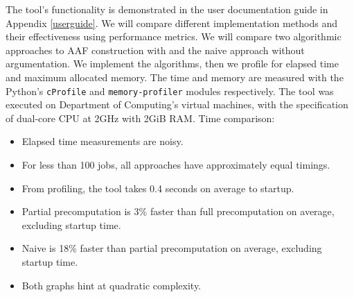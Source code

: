 The tool's functionality is demonstrated in the user documentation guide in Appendix \ref{userguide}. We will compare different implementation methods and their effectiveness using performance metrics. We will compare two algorithmic approaches to AAF construction with and the naive approach without argumentation. We implement the algorithms, then we profile for elapsed time and maximum allocated memory. The time and memory are measured with the Python's \texttt{cProfile} and \texttt{memory-profiler} modules respectively. The tool was executed on Department of Computing's virtual machines, with the specification of dual-core CPU at 2GHz with 2GiB RAM.
\linespace
Time comparison:
\begin{itemize}
	\item Elapsed time measurements are noisy.
	\item For less than 100 jobs, all approaches have approximately equal timings.
	\item From profiling, the tool takes 0.4 seconds on average to startup.
	\item Partial precomputation is 3\% faster than full precomputation on average, excluding startup time.
	\item Naive is 18\% faster than partial precomputation on average, excluding startup time.
	\item Both graphs hint at quadratic complexity.
\end{itemize}

